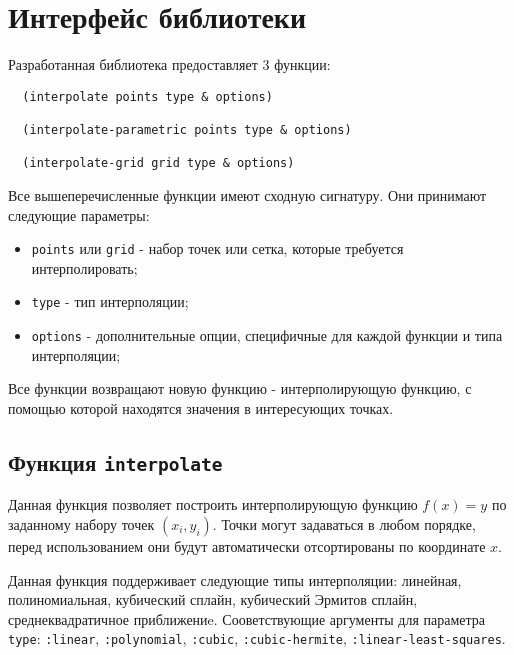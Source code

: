 \section{Интерфейс библиотеки}

Разработанная библиотека предоставляет 3 функции:

\begin{verbatim}
  (interpolate points type & options)

  (interpolate-parametric points type & options)

  (interpolate-grid grid type & options)
\end{verbatim}

Все вышеперечисленные функции имеют сходную сигнатуру. Они принимают следующие параметры:

\begin{itemize}
\item \texttt{points} или \texttt{grid} - набор точек или сетка, которые требуется интерполировать;
\item \texttt{type} - тип интерполяции;
\item \texttt{options} - дополнительные опции, специфичные для каждой функции и типа интерполяции;
\end{itemize}

Все функции возвращают новую функцию - интерполирующую функцию, с помощью которой находятся значения в интересующих точках.

\subsection{Функция \texttt{interpolate}}

Данная функция позволяет построить интерполирующую функцию $f(x) = y$ по заданному набору точек $(x_i, y_i)$. Точки могут задаваться в любом порядке, перед использованием они будут автоматически отсортированы по координате $x$.

Данная функция поддерживает следующие типы интерполяции: линейная, полиномиальная, кубический сплайн, кубический Эрмитов сплайн, среднеквадратичное приближениe. Сооветствующие аргументы для параметра \texttt{type}: \texttt{:linear}, \texttt{:polynomial}, \texttt{:cubic}, \texttt{:cubic-hermite}, \texttt{:linear-least-squares}.

